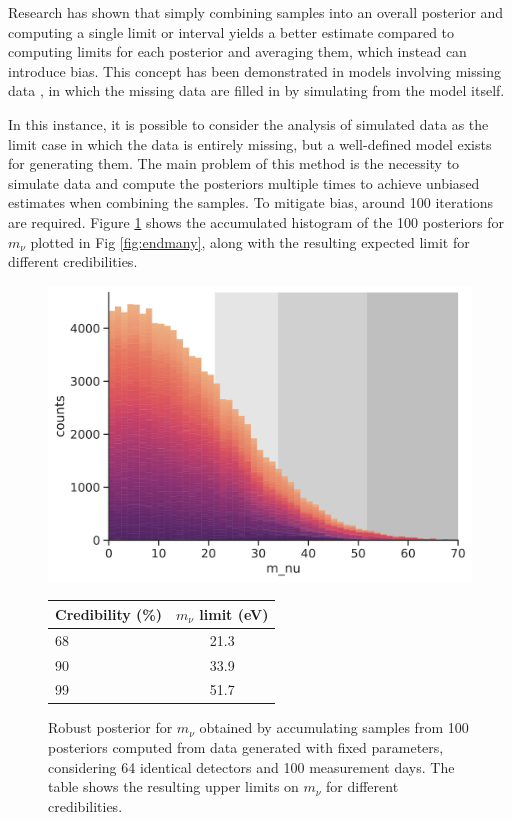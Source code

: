 Research has shown that simply combining samples into an overall posterior and computing a single limit or interval
yields a better estimate compared to computing limits for each posterior and averaging them, which instead can
introduce bias. This concept has been demonstrated in models involving missing data  \cite{zhou2010note}, in which the missing data are
filled in by simulating from the model itself.

In this instance, it is possible to consider the analysis of simulated data as the limit case in which the data is entirely missing, but a
well-defined model exists for generating them. The main problem of this method is the necessity to  simulate data and compute the
posteriors multiple times to achieve unbiased estimates when combining the samples. To mitigate bias, around 100
iterations are required.
Figure \ref{fig:robust} shows the accumulated histogram of the 100 posteriors for $m_\nu$ plotted in Fig \ref{fig:endmany}, along with
the resulting expected limit for different credibilities.
\begin{figure}[t]
  \begin{minipage}{0.45\linewidth}
  \includegraphics[width=\textwidth]{figures/ch3/endpoint/robust_0.png}
  \end{minipage}
  \hfill
  \begin{minipage}{0.45\linewidth}
    \centering
\begin{tabular}{lc}
\toprule
Credibility (\%) & $m_{\nu}$ limit (eV) \\
\midrule
68 & 21.3 \\
90  & 33.9 \\
99  & 51.7 \\
\bottomrule
\end{tabular}
\end{minipage}
\caption{Robust posterior for $m_\nu$ obtained by accumulating samples from 100 posteriors computed from data generated with fixed
parameters, considering 64 identical detectors and 100 measurement days. The table shows the resulting upper limits on
$m_\nu$ for different credibilities.}
\label{fig:robust}
\end{figure}


